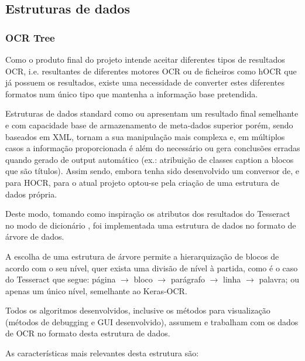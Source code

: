 \subsection{Estruturas de dados}
\label{data_structures}


\subsubsection{OCR Tree}
\label{ocr_tree}

Como o produto final do projeto intende aceitar diferentes tipos de resultados OCR, i.e. resultantes de diferentes motores OCR ou de ficheiros como hOCR que já possuem os resultados, existe uma necessidade de converter estes diferentes formatos num único tipo que mantenha a informação base pretendida.

Estruturas de dados standard como \citep{hocr_doc} ou \citep{alto_doc} apresentam um resultado final semelhante e com capacidade base de armazenamento de meta-dados superior porém, sendo baseados em XML, tornam a sua manipulação mais complexa e, em múltiplos casos a informação proporcionada é além do necessário ou gera conclusões erradas quando gerado de output automático (ex.: atribuição de classes caption a blocos que são títulos). Assim sendo, embora tenha sido desenvolvido um conversor de, e para HOCR, para o atual projeto optou-se pela criação de uma estrutura de dados própria.

Deste modo, tomando como inspiração os atributos dos resultados do Tesseract no modo de dicionário \citep{tesseract_doc}, foi implementada uma estrutura de dados no formato de árvore de dados.

A escolha de uma estrutura de árvore permite a hierarquização de blocos de acordo com o seu nível, quer exista uma divisão de nível à partida, como é o caso do Tesseract que segue: página $\longrightarrow$ bloco $\longrightarrow$ parágrafo $\longrightarrow$ linha $\longrightarrow$ palavra; ou apenas um único nível, semelhante ao Keras-OCR.

Todos os algoritmos desenvolvidos, inclusive os métodos para visualização (métodos de debugging e GUI desenvolvido), assumem e trabalham com os dados de OCR no formato desta estrutura de dados.

As características mais relevantes desta estrutura são:

